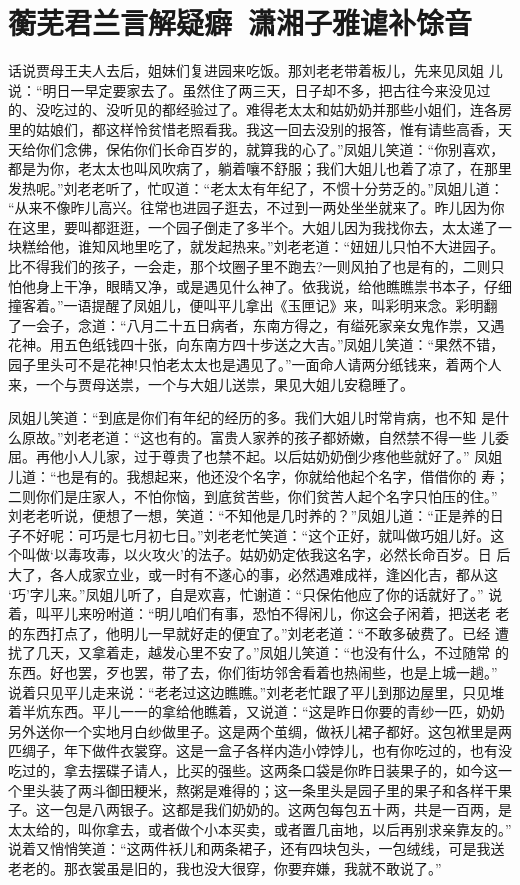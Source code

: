 \chapter{蘅芜君兰言解疑癖~潇湘子雅谑补馀音}

话说贾母王夫人去后，姐妹们复进园来吃饭。那刘老老带着板儿，先来见凤姐
儿说：“明日一早定要家去了。虽然住了两三天，日子却不多，把古往今来没见过
的、没吃过的、没听见的都经验过了。难得老太太和姑奶奶并那些小姐们，连各房
里的姑娘们，都这样怜贫惜老照看我。我这一回去没别的报答，惟有请些高香，天
天给你们念佛，保佑你们长命百岁的，就算我的心了。”凤姐儿笑道：“你别喜欢，
都是为你，老太太也叫风吹病了，躺着嚷不舒服；我们大姐儿也着了凉了，在那里
发热呢。”刘老老听了，忙叹道：“老太太有年纪了，不惯十分劳乏的。”凤姐儿道：
“从来不像昨儿高兴。往常也进园子逛去，不过到一两处坐坐就来了。昨儿因为你
在这里，要叫都逛逛，一个园子倒走了多半个。大姐儿因为我找你去，太太递了一
块糕给他，谁知风地里吃了，就发起热来。”刘老老道：“妞妞儿只怕不大进园子。
比不得我们的孩子，一会走，那个坟圈子里不跑去?一则风拍了也是有的，二则只
怕他身上干净，眼睛又净，或是遇见什么神了。依我说，给他瞧瞧祟书本子，仔细
撞客着。”一语提醒了凤姐儿，便叫平儿拿出《玉匣记》来，叫彩明来念。彩明翻
了一会子，念道：“八月二十五日病者，东南方得之，有缢死家亲女鬼作祟，又遇
花神。用五色纸钱四十张，向东南方四十步送之大吉。”凤姐儿笑道：“果然不错，
园子里头可不是花神!只怕老太太也是遇见了。”一面命人请两分纸钱来，着两个人
来，一个与贾母送祟，一个与大姐儿送祟，果见大姐儿安稳睡了。

凤姐儿笑道：“到底是你们有年纪的经历的多。我们大姐儿时常肯病，也不知
是什么原故。”刘老老道：“这也有的。富贵人家养的孩子都娇嫩，自然禁不得一些
儿委屈。再他小人儿家，过于尊贵了也禁不起。以后姑奶奶倒少疼他些就好了。”
凤姐儿道：“也是有的。我想起来，他还没个名字，你就给他起个名字，借借你的
寿；二则你们是庄家人，不怕你恼，到底贫苦些，你们贫苦人起个名字只怕压的住。”
刘老老听说，便想了一想，笑道：“不知他是几时养的？”凤姐儿道：“正是养的日
子不好呢：可巧是七月初七日。”刘老老忙笑道：“这个正好，就叫做巧姐儿好。这
个叫做‘以毒攻毒，以火攻火’的法子。姑奶奶定依我这名字，必然长命百岁。日
后大了，各人成家立业，或一时有不遂心的事，必然遇难成祥，逢凶化吉，都从这
‘巧’字儿来。”凤姐儿听了，自是欢喜，忙谢道：“只保佑他应了你的话就好了。”
说着，叫平儿来吩咐道：“明儿咱们有事，恐怕不得闲儿，你这会子闲着，把送老
老的东西打点了，他明儿一早就好走的便宜了。”刘老老道：“不敢多破费了。已经
遭扰了几天，又拿着走，越发心里不安了。”凤姐儿笑道：“也没有什么，不过随常
的东西。好也罢，歹也罢，带了去，你们街坊邻舍看着也热闹些，也是上城一趟。”
说着只见平儿走来说：“老老过这边瞧瞧。”刘老老忙跟了平儿到那边屋里，只见堆
着半炕东西。平儿一一的拿给他瞧着，又说道：“这是昨日你要的青纱一匹，奶奶
另外送你一个实地月白纱做里子。这是两个茧绸，做袄儿裙子都好。这包袱里是两
匹绸子，年下做件衣裳穿。这是一盒子各样内造小饽饽儿，也有你吃过的，也有没
吃过的，拿去摆碟子请人，比买的强些。这两条口袋是你昨日装果子的，如今这一
个里头装了两斗御田粳米，熬粥是难得的；这一条里头是园子里的果子和各样干果
子。这一包是八两银子。这都是我们奶奶的。这两包每包五十两，共是一百两，是
太太给的，叫你拿去，或者做个小本买卖，或者置几亩地，以后再别求亲靠友的。”
说着又悄悄笑道：“这两件袄儿和两条裙子，还有四块包头，一包绒线，可是我送
老老的。那衣裳虽是旧的，我也没大很穿，你要弃嫌，我就不敢说了。”

